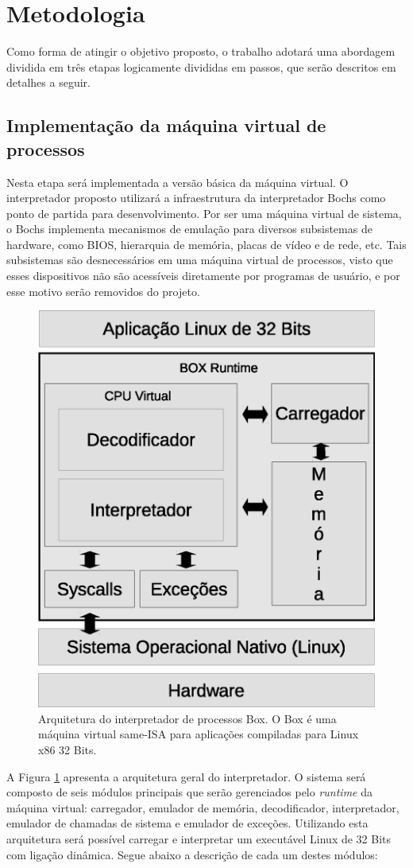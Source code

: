 \documentclass[11pt,twoside]{article}
\begin{document}
\section{Metodologia}  \label{sec:metodologia}

Como forma de atingir o objetivo proposto, o trabalho adotará uma abordagem 
dividida em três etapas logicamente divididas em passos, que serão descritos 
em detalhes a seguir.

\subsection{Implementação da máquina virtual de processos}

Nesta etapa será implementada a versão básica da máquina virtual. O 
interpretador proposto utilizará a infraestrutura da interpretador Bochs 
como ponto de partida para desenvolvimento. Por ser uma máquina virtual de 
sistema, o Bochs implementa mecanismos de emulação para diversos subsistemas 
de hardware, como BIOS, hierarquia de memória, placas de vídeo e de rede, etc. 
Tais subsistemas são desnecessários em uma máquina virtual de processos, visto 
que esses dispositivos não são acessíveis diretamente por programas de usuário, 
e por esse motivo serão removidos do projeto.

\begin{figure}[h]
 \centering
 \includegraphics[width=0.5\columnwidth]{./figures/box-architecture.eps}
 \caption{Arquitetura do interpretador de processos Box. 
 O Box é uma máquina virtual same-ISA para aplicações compiladas para Linux x86 32 Bits.}
 \label{fig:box-architecture}
\end{figure}

A Figura \ref{fig:box-architecture} apresenta a arquitetura geral do interpretador.
O sistema será composto de seis módulos principais que serão gerenciados pelo \textit{runtime}
da máquina virtual: carregador, emulador de memória, decodificador, interpretador, 
emulador de chamadas de sistema e emulador de exceções. Utilizando esta arquitetura 
será possível carregar e interpretar um executável Linux de 32 Bits com ligação dinâmica. 
Segue abaixo a descrição de cada um destes módulos:
\end{document}

